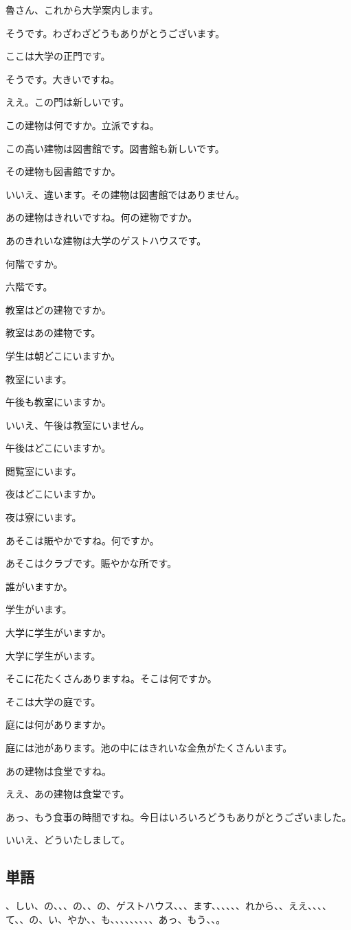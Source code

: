 \documentclass[a5j]{ltjtarticle}
\newcommand*{\RuSpeaks}{\item[魯]}
\newcommand*{\LiSpeaks}{\item[李]}
\begin{document}
\begin{dialogue}[labelwidth=\zw]
  \LiSpeaks 魯さん、これから大学案内します。
  \RuSpeaks そうです。わざわざどうもありがとうございます。
  \LiSpeaks ここは大学の正門です。
  \RuSpeaks そうです。大きいですね。
  \LiSpeaks ええ。この門は新しいです。
  \RuSpeaks この建物は何ですか。立派ですね。
  \LiSpeaks この高い建物は図書館です。図書館も新しいです。
  \RuSpeaks その建物も図書館ですか。
  \LiSpeaks いいえ、違います。その建物は図書館ではありません。
  \RuSpeaks あの建物はきれいですね。何の建物ですか。
  \LiSpeaks あのきれいな建物は大学のゲストハウスです。
  \RuSpeaks 何階ですか。
  \LiSpeaks 六階です。
  \RuSpeaks 教室はどの建物ですか。
  \LiSpeaks 教室はあの建物です。
  \RuSpeaks 学生は朝どこにいますか。
  \LiSpeaks 教室にいます。
  \RuSpeaks 午後も教室にいますか。
  \LiSpeaks いいえ、午後は教室にいません。
  \RuSpeaks 午後はどこにいますか。
  \LiSpeaks 閲覧室にいます。
  \RuSpeaks 夜はどこにいますか。
  \LiSpeaks 夜は寮にいます。
  \RuSpeaks あそこは賑やかですね。何ですか。
  \LiSpeaks あそこはクラブです。賑やかな所です。
  \RuSpeaks {}誰がいますか。
  \LiSpeaks {}学生がいます。
  \RuSpeaks 大学に学生がいますか。
  \LiSpeaks 大学に学生がいます。
  \RuSpeaks そこに花たくさんありますね。そこは何ですか。
  \LiSpeaks そこは大学の庭です。
  \RuSpeaks 庭には何がありますか。
  \LiSpeaks 庭には池があります。池の中にはきれいな金魚がたくさんいます。
  \RuSpeaks あの建物は食堂ですね。
  \LiSpeaks ええ、あの建物は食堂です。
  \RuSpeaks あっ、もう食事の時間ですね。今日はいろいろどうもありがとうございました。
  \LiSpeaks いいえ、どういたしまして。
\end{dialogue}

\subsection*{単語}

\begin{onehalfspace}
  、しい、の、、、の、、の、ゲストハウス、、、ます、、、、、、れから、、ええ、、、、て、、の、い、やか、、も、、、、、、、、、あっ、もう、、。
\end{onehalfspace}
\end{document}
